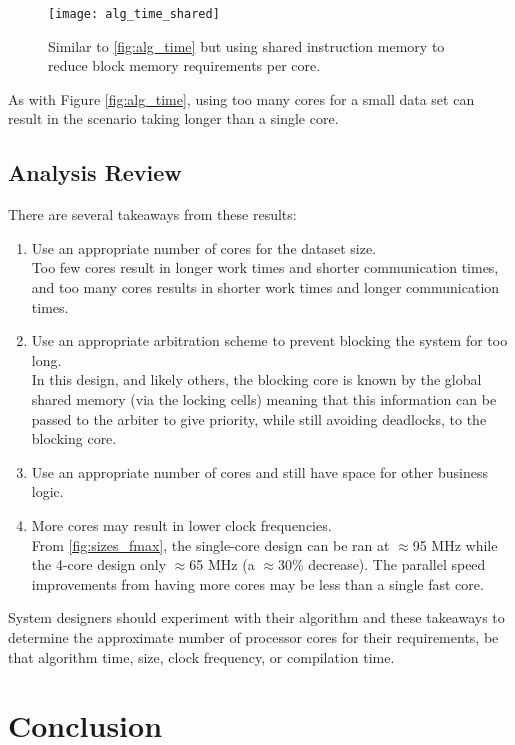 \begin{figure}[h]
\centering
\texttt{[image: alg\_time\_shared]}
\caption{Similar to \cref{fig:alg_time} but using shared instruction memory to reduce block memory requirements per core.}
\label{fig:alg_time_shared}
\end{figure}

As with Figure \ref{fig:alg_time}, using too many cores for a small data set can result in the scenario taking longer than a single core.

\clearpage
\section{Analysis Review}
There are several takeaways from these results:
\begin{enumerate}
\item Use an appropriate number of cores for the dataset size.\\Too few cores result in longer work times and shorter communication times, and too many cores results in shorter work times and longer communication times.

\item Use an appropriate arbitration scheme to prevent blocking the system for too long.\\
In this design, and likely others, the blocking core is known by the global shared memory (via the locking cells) meaning that this information can be passed to the arbiter to give priority, while still avoiding deadlocks, to the blocking core.

\item Use an appropriate number of cores and still have space for other business logic.

\item More cores may result in lower clock frequencies.\\From \cref{fig:sizes_fmax}, the single-core design can be ran at $\approx$95 MHz while the 4-core design only $\approx$65 MHz (a $\approx$30\% decrease). The parallel speed improvements from having more cores may be less than a single fast core.
\end{enumerate}

System designers should experiment with their algorithm and these takeaways to determine the approximate number of processor cores for their requirements, be that algorithm time, size, clock frequency, or compilation time.

\chapter{Conclusion}
\startcontents[chapters]

